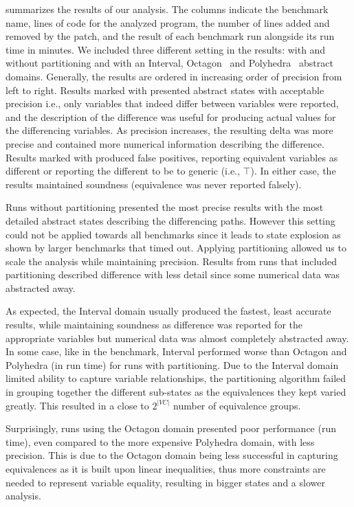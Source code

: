  summarizes the results of our analysis. The columns indicate the benchmark name, lines of code for the analyzed program, the number of lines added and removed by the patch, and the result of each benchmark run alongside its run time in minutes. We included three different setting in the results: with and without partitioning and with an Interval, Octagon~\cite{Mine2006} and Polyhedra~\cite{CousotHalbwachs78} abstract domains. Generally, the results are ordered in increasing order of precision from left to right. Results marked with \checkmark presented abstract states with acceptable precision i.e., only variables that indeed differ between variables were reported, and the description of the difference was useful for producing actual values for the differencing variables. As precision increases, the resulting delta was more precise and contained more numerical information describing the difference. Results marked with \xmark produced false positives, reporting equivalent variables as different or reporting the different to be to generic (i.e., $\top$). In either case, the results maintained soundness (equivalence was never reported falsely).

Runs without partitioning presented the most precise results with the most detailed abstract states describing the differencing paths. However this setting could not be applied towards all benchmarks since it leads to state explosion as shown by larger benchmarks that timed out. Applying partitioning allowed us to scale the analysis while maintaining precision. Results from runs that included partitioning described difference with less detail since some numerical data was abstracted away.

As expected, the Interval domain usually produced the fastest, least accurate results, while maintaining soundness as difference was reported for the appropriate variables but numerical data was almost completely abstracted away. In some case, like in the  benchmark, Interval performed worse than Octagon and Polyhedra (in run time) for runs with partitioning. Due to the Interval domain limited ability to capture variable relationships, the partitioning algorithm failed in grouping together the different sub-states as the equivalences they kept varied greatly. This resulted in a close to $2^{|VC|}$ number of equivalence groups. 

Surprisingly, runs using the Octagon domain presented poor performance (run time), even compared to the more expensive Polyhedra domain, with less precision. This is due to the Octagon domain being less successful in capturing equivalences as it is built upon linear inequalities, thus more constraints are needed to represent variable equality, resulting in bigger states and a slower analysis.

